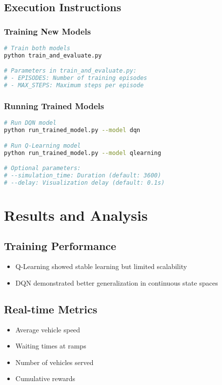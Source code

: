 \documentclass[a4paper, 12pt]{article}
\begin{document}
\subsection{Execution Instructions}
\begin{tcolorbox}[title=Running the Project]
\subsubsection{Training New Models}
\begin{lstlisting}[language=bash]
# Train both models
python train_and_evaluate.py

# Parameters in train_and_evaluate.py:
# - EPISODES: Number of training episodes
# - MAX_STEPS: Maximum steps per episode
\end{lstlisting}

\subsubsection{Running Trained Models}
\begin{lstlisting}[language=bash]
# Run DQN model
python run_trained_model.py --model dqn

# Run Q-Learning model
python run_trained_model.py --model qlearning

# Optional parameters:
# --simulation_time: Duration (default: 3600)
# --delay: Visualization delay (default: 0.1s)
\end{lstlisting}
\end{tcolorbox}

\section{Results and Analysis}

\subsection{Training Performance}
\begin{itemize}
    \item Q-Learning showed stable learning but limited scalability
    \item DQN demonstrated better generalization in continuous state spaces
\end{itemize}

\subsection{Real-time Metrics}
\begin{itemize}
    \item Average vehicle speed
    \item Waiting times at ramps
    \item Number of vehicles served
    \item Cumulative rewards
\end{itemize}
\end{document}
